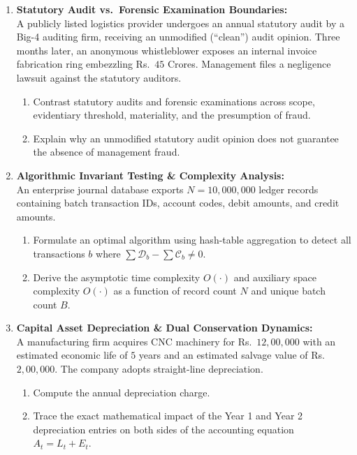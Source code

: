 \begin{enumerate}[label=\textbf{P1.\arabic*}]
    \item \textbf{Statutory Audit vs.~Forensic Examination Boundaries:}\\
    A publicly listed logistics provider undergoes an annual statutory audit by a Big-4 auditing firm, receiving an unmodified (``clean'') audit opinion. Three months later, an anonymous whistleblower exposes an internal invoice fabrication ring embezzling Rs.~$45$ Crores. Management files a negligence lawsuit against the statutory auditors.
    \begin{enumerate}[label=(\alph*)]
        \item Contrast statutory audits and forensic examinations across scope, evidentiary threshold, materiality, and the presumption of fraud.
        \item Explain why an unmodified statutory audit opinion does not guarantee the absence of management fraud.
    \end{enumerate}

    \item \textbf{Algorithmic Invariant Testing \& Complexity Analysis:}\\
    An enterprise journal database exports $N = 10{,}000{,}000$ ledger records containing batch transaction IDs, account codes, debit amounts, and credit amounts.
    \begin{enumerate}[label=(\alph*)]
        \item Formulate an optimal algorithm using hash-table aggregation to detect all transactions $b$ where $\sum \mathcal{D}_b - \sum \mathcal{C}_b \ne 0$.
        \item Derive the asymptotic time complexity $O(\cdot)$ and auxiliary space complexity $O(\cdot)$ as a function of record count $N$ and unique batch count $B$.
    \end{enumerate}

    \item \textbf{Capital Asset Depreciation \& Dual Conservation Dynamics:}\\
    A manufacturing firm acquires CNC machinery for Rs.~$12{,}00{,}000$ with an estimated economic life of $5$ years and an estimated salvage value of Rs.~$2{,}00{,}000$. The company adopts straight-line depreciation.
    \begin{enumerate}[label=(\alph*)]
        \item Compute the annual depreciation charge.
        \item Trace the exact mathematical impact of the Year 1 and Year 2 depreciation entries on both sides of the accounting equation $A_t = L_t + E_t$.
    \end{enumerate}
\end{enumerate}

